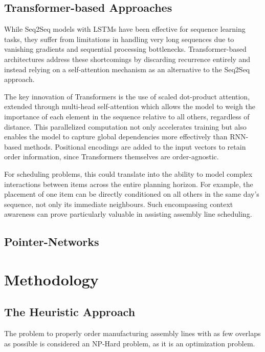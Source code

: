 \documentclass[12pt,a4paper]{report}
\begin{document}
\section{Transformer-based Approaches}

While Seq2Seq models with LSTMs have been effective for sequence learning tasks, they suffer from limitations in handling very long sequences due to vanishing gradients and sequential processing bottlenecks. Transformer-based architectures address these shortcomings by discarding recurrence entirely and instead relying on a self-attention mechanism as an alternative to the Seq2Seq approach.

The key innovation of Transformers is the use of scaled dot-product attention, extended through multi-head self-attention which allows the model to weigh the importance of each element in the sequence relative to all others, regardless of distance. This parallelized computation not only accelerates training but also enables the model to capture global dependencies more effectively than RNN-based methods. Positional encodings are added to the input vectors to retain order information, since Transformers themselves are order-agnostic.\cite{ref5} 

For scheduling problems, this could translate into the ability to model complex interactions between items across the entire planning horizon. For example, the placement of one item can be directly conditioned on all others in the same day’s sequence, not only its immediate neighbours. Such encompassing context awareness can prove particularly valuable in assisting assembly line scheduling.

\section{Pointer-Networks}
\cite{ref7}

\chapter{Methodology}
\section{The Heuristic Approach}

The problem to properly order manufacturing assembly lines with as few overlaps as possible is considered an NP-Hard problem, as it is an optimization problem.
\end{document}
